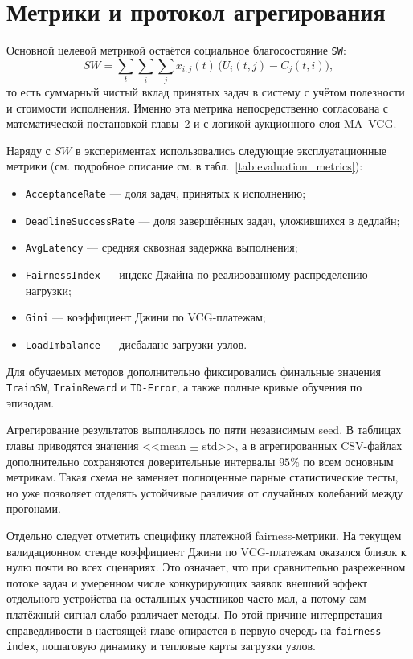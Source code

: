 \section{Метрики и протокол агрегирования}\label{sec:metrics}

Основной целевой метрикой остаётся социальное благосостояние \texttt{SW}:
\begin{equation}
SW = \sum_{t}\sum_{i}\sum_{j} x_{i,j}(t)\,\bigl(U_i(t,j)-C_j(t,i)\bigr),
\end{equation}
то есть суммарный чистый вклад принятых задач в систему с учётом полезности
и стоимости исполнения. Именно эта метрика непосредственно согласована с
математической постановкой главы~2 и с логикой аукционного слоя MA--VCG.

Наряду с $SW$ в экспериментах использовались следующие эксплуатационные
метрики (см. подробное описание см. в табл.~\ref{tab:evaluation_metrics}):
\begin{itemize}
	\item \texttt{AcceptanceRate} --- доля задач, принятых к исполнению;
	\item \texttt{DeadlineSuccessRate} --- доля завершённых задач, уложившихся
	в дедлайн;
	\item \texttt{AvgLatency} --- средняя сквозная задержка выполнения;
	\item \texttt{FairnessIndex} --- индекс Джайна по реализованному
	распределению нагрузки;
	\item \texttt{Gini} --- коэффициент Джини по VCG-платежам;
	\item \texttt{LoadImbalance} --- дисбаланс загрузки узлов.
\end{itemize}

Для обучаемых методов дополнительно фиксировались финальные значения
\texttt{TrainSW}, \texttt{TrainReward} и \texttt{TD-Error}, а также полные кривые обучения по эпизодам.

Агрегирование результатов выполнялось по пяти независимым seed. В таблицах
главы приводятся значения <<mean $\pm$ std>>, а в агрегированных CSV-файлах
дополнительно сохраняются доверительные интервалы $95\%$ по всем основным
метрикам. Такая схема не заменяет полноценные парные статистические тесты,
но уже позволяет отделять устойчивые различия от случайных колебаний между
прогонами.

Отдельно следует отметить специфику платежной fairness-метрики. На текущем
валидационном стенде коэффициент Джини по VCG-платежам оказался близок к
нулю почти во всех сценариях. Это означает, что при сравнительно разреженном
потоке задач и умеренном числе конкурирующих заявок внешний эффект
отдельного устройства на остальных участников часто мал, а потому сам
платёжный сигнал слабо различает методы. По этой причине интерпретация
справедливости в настоящей главе опирается в первую очередь на
\texttt{fairness index}, пошаговую динамику и тепловые карты загрузки узлов.
